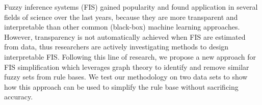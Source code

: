 
Fuzzy inference systems (FIS) gained popularity and found application in several fields of science over the last years, because they are more transparent and interpretable than other common (black-box) machine learning approaches.
However, transparency is not automatically achieved when FIS are estimated from data, thus researchers are actively investigating methods to design interpretable FIS.
Following this line of research, we propose a new approach for FIS simplification which leverages graph theory to identify and remove similar fuzzy sets from rule bases.
We test our methodology on two data sets to show how this approach can be used to simplify the rule base without sacrificing accuracy.



